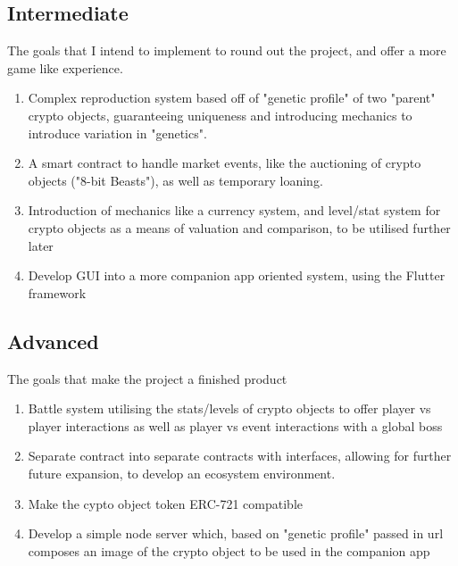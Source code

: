 \documentclass{article}
\begin{document}
\subsection*{Intermediate}
The goals that I intend to implement to round out the project, and offer a more game like experience.
\begin{enumerate}
    \item Complex reproduction system based off of "genetic profile" of two "parent" crypto objects, guaranteeing uniqueness and introducing mechanics to introduce variation in "genetics".
    \item A smart contract to handle market events, like the auctioning of crypto objects ("8-bit Beasts"), as well as temporary loaning.
    \item Introduction of mechanics like a currency system, and level/stat system for crypto objects as a means of valuation and comparison, to be utilised further later
    \item Develop GUI into a more companion app oriented system, using the Flutter framework
\end{enumerate}
\subsection*{Advanced}
The goals that make the project a finished product
\begin{enumerate}
    \item Battle system utilising the stats/levels of crypto objects to offer player vs player interactions as well as player vs event interactions with a global boss
    \item Separate contract into separate contracts with interfaces, allowing for further future expansion, to develop an ecosystem environment.
    \item Make the cypto object token ERC-721 compatible
    \item Develop a simple node server which, based on "genetic profile" passed in url composes an image of the crypto object to be used in the companion app
\end{enumerate}
\end{document}
